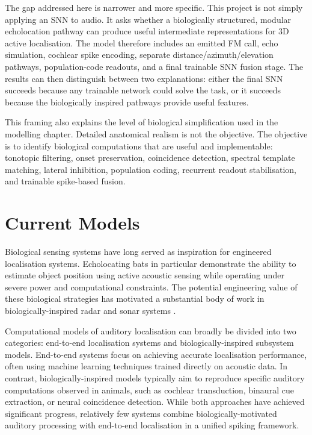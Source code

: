 The gap addressed here is narrower and more specific. This project is not simply applying an SNN to audio. It asks whether a biologically structured, modular echolocation pathway can produce useful intermediate representations for 3D active localisation. The model therefore includes an emitted FM call, echo simulation, cochlear spike encoding, separate distance/azimuth/elevation pathways, population-code readouts, and a final trainable SNN fusion stage. The results can then distinguish between two explanations: either the final SNN succeeds because any trainable network could solve the task, or it succeeds because the biologically inspired pathways provide useful features.

This framing also explains the level of biological simplification used in the modelling chapter. Detailed anatomical realism is not the objective. The objective is to identify biological computations that are useful and implementable: tonotopic filtering, onset preservation, coincidence detection, spectral template matching, lateral inhibition, population coding, recurrent readout stabilisation, and trainable spike-based fusion.





\section{Current Models}

Biological sensing systems have long served as inspiration for engineered localisation systems. Echolocating bats in particular demonstrate the ability to estimate object position using active acoustic sensing while operating under severe power and computational constraints. The potential engineering value of these biological strategies has motivated a substantial body of work in biologically-inspired radar and sonar systems \cite{Balleri2017Biologically-inspiredNature}.

Computational models of auditory localisation can broadly be divided into two categories: end-to-end localisation systems and biologically-inspired subsystem models. End-to-end systems focus on achieving accurate localisation performance, often using machine learning techniques trained directly on acoustic data. In contrast, biologically-inspired models typically aim to reproduce specific auditory computations observed in animals, such as cochlear transduction, binaural cue extraction, or neural coincidence detection. While both approaches have achieved significant progress, relatively few systems combine biologically-motivated auditory processing with end-to-end localisation in a unified spiking framework.

